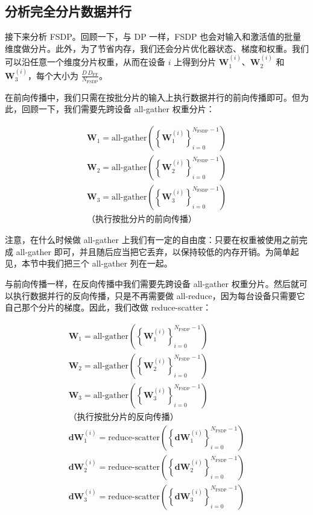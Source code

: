 \subsection{分析完全分片数据并行}

接下来分析 FSDP。回顾一下，与 DP 一样，FSDP 也会对输入和激活值的批量维度做分片。此外，为了节省内存，我们还会分片优化器状态、梯度和权重。我们可以沿任意一个维度分片权重，从而在设备 $i$ 上得到分片 $\boldsymbol{W}_1^{(i)}$、$\boldsymbol{W}_2^{(i)}$ 和 $\boldsymbol{W}_3^{(i)}$，每个大小为 $\frac{D\,D_{\mathrm{FF}}}{N_{\mathrm{FSDP}}}$。

在前向传播中，我们只需在按批分片的输入上执行数据并行的前向传播即可。但为此，回顾一下，我们需要先跨设备 all-gather 权重分片：

\begin{gather}
\boldsymbol{W}_1 = \text{all-gather}\left(\left\{\boldsymbol{W}_1^{(i)}\right\}_{i=0}^{N_{\mathrm{FSDP}}-1}\right) \tag{34}\\
\boldsymbol{W}_2 = \text{all-gather}\left(\left\{\boldsymbol{W}_2^{(i)}\right\}_{i=0}^{N_{\mathrm{FSDP}}-1}\right) \tag{35}\\
\boldsymbol{W}_3 = \text{all-gather}\left(\left\{\boldsymbol{W}_3^{(i)}\right\}_{i=0}^{N_{\mathrm{FSDP}}-1}\right) \tag{36}\\
\text{（执行按批分片的前向传播）} \tag{37}
\end{gather}

注意，在什么时候做 all-gather 上我们有一定的自由度：只要在权重被使用之前完成 all-gather 即可，并且随后应当把它丢弃，以保持较低的内存开销。为简单起见，本节中我们把三个 all-gather 列在一起。

与前向传播一样，在反向传播中我们需要先跨设备 all-gather 权重分片。然后就可以执行数据并行的反向传播，只是不再需要做 all-reduce，因为每台设备只需要它自己那个分片的梯度。因此，我们改做 reduce-scatter：

\begin{gather}
\boldsymbol{W}_1 = \text{all-gather}\left(\left\{\boldsymbol{W}_1^{(i)}\right\}_{i=0}^{N_{\mathrm{FSDP}}-1}\right) \tag{38}\\
\boldsymbol{W}_2 = \text{all-gather}\left(\left\{\boldsymbol{W}_2^{(i)}\right\}_{i=0}^{N_{\mathrm{FSDP}}-1}\right) \tag{39}\\
\boldsymbol{W}_3 = \text{all-gather}\left(\left\{\boldsymbol{W}_3^{(i)}\right\}_{i=0}^{N_{\mathrm{FSDP}}-1}\right) \tag{40}\\
\text{（执行按批分片的反向传播）} \tag{41}\\
\boldsymbol{dW}_1^{(i)} = \text{reduce-scatter}\left(\left\{\boldsymbol{dW}_1^{(i)}\right\}_{i=0}^{N_{\mathrm{FSDP}}-1}\right) \tag{42}\\
\boldsymbol{dW}_2^{(i)} = \text{reduce-scatter}\left(\left\{\boldsymbol{dW}_2^{(i)}\right\}_{i=0}^{N_{\mathrm{FSDP}}-1}\right) \tag{43}\\
\boldsymbol{dW}_3^{(i)} = \text{reduce-scatter}\left(\left\{\boldsymbol{dW}_3^{(i)}\right\}_{i=0}^{N_{\mathrm{FSDP}}-1}\right) \tag{44}
\end{gather}


